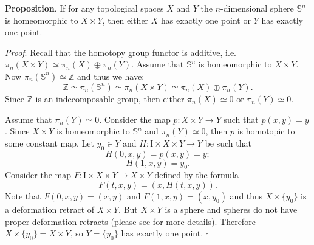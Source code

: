 \documentclass[12pt]{article}
\begin{document}
\textbf{Proposition}. If for any topological spaces $X$ and $Y$ the $n$-dimensional sphere $\mathbb{S}^{n}$ is homeomorphic to $X\times Y$, then either $X$ has exactly one point or $Y$ has exactly one point.

\textit{Proof}. Recall that the homotopy group functor is additive, i.e. $\pi_{n}(X\times Y)\simeq\pi_{n}(X)\oplus\pi_{n}(Y)$. Assume that $\mathbb{S}^{n}$ is homeomorphic to $X\times Y$. Now $\pi_{n}(\mathbb{S}^{n})\simeq\mathbb{Z}$ and thus we have:
$$\mathbb{Z}\simeq\pi_{n}(\mathbb{S}^{n})\simeq\pi_{n}(X\times Y)\simeq\pi_{n}(X)\oplus\pi_{n}(Y).$$
Since $\mathbb{Z}$ is an indecomposable group, then either $\pi_{n}(X)\simeq 0$ or $\pi_{n}(Y)\simeq 0$.

Assume that $\pi_{n}(Y)\simeq 0$. Consider the map $p:X\times Y\to Y$ such that $p(x,y)=y$. Since $X\times Y$ is homeomorphic to $\mathbb{S}^{n}$ and $\pi_{n}(Y)\simeq 0$, then $p$ is homotopic to some constant map. Let $y_0\in Y$ and $H:\mathrm{I}\times X\times Y\to Y$ be such that 
$$H(0,x,y)=p(x,y)=y;$$
$$H(1,x,y)=y_0.$$
Consider the map $F:\mathrm{I}\times X\times Y\to X\times Y$ defined by the formula
$$F(t,x,y)=(x,H(t,x,y)).$$
Note that $F(0,x,y)=(x,y)$ and $F(1,x,y)=(x,y_{0})$ and thus $X\times\{y_0\}$ is a deformation retract of $X\times Y$. But $X\times Y$ is a sphere and spheres do not have proper deformation retracts (please see  for more details). Therefore $X\times\{y_{0}\}=X\times Y$, so $Y=\{y_{0}\}$ has exactly one point. $\square$
\end{document}

